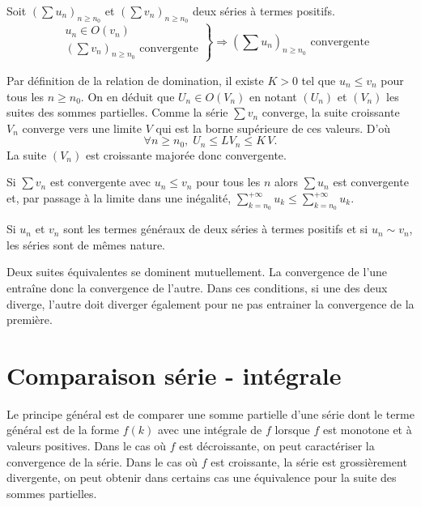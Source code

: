 \begin{prop}
  Soit $\left( \sum u_n\right)_{n\geq n_0}$ et $\left( \sum v_n\right)_{n\geq n_0}$ deux séries à termes positifs.
\begin{displaymath}
  \left. 
  \begin{aligned}
    &u_n \in O(v_n) \\ &\left( \sum v_n\right)_{n\geq n_0} \text{ convergente}
  \end{aligned}
  \right\rbrace 
\Rightarrow \left( \sum u_n\right)_{n\geq n_0} \text{ convergente}
\end{displaymath}
\end{prop}
\begin{demo}
Par définition de la relation de domination, il existe $K>0$ tel que $u_n \leq v_n$ pour tous les $n \geq n_0$. On en déduit que $U_n \in O(V_n)$ en notant $(U_n)$ et $(V_n)$ les suites des sommes partielles. Comme la série $\sum v_n$ converge, la suite croissante $V_n$ converge vers une limite $V$ qui est la borne supérieure de ces valeurs. D'où
\[
 \forall n \geq n_0, \; U_n \leq LV_n \leq K\, V.
\]
La suite $(V_n)$ est croissante majorée donc convergente.
\end{demo}
\begin{rem}
 Si $\sum v_n$ est convergente avec $u_n \leq v_n$ pour tous les $n$ alors $\sum u_n$ est convergente et, par passage à la limite dans une inégalité, $\sum_{k=n_0}^{+\infty} u_k \leq \sum_{k=n_0}^{+\infty} u_k$.
\end{rem}

\begin{prop}
  Si $u_n$ et $v_n$ sont les termes généraux de deux séries à termes positifs et si $u_n \sim v_n$, les séries sont de mêmes nature.
\end{prop}
\begin{demo}
  Deux suites équivalentes se dominent mutuellement. La convergence de l'une entraîne donc la convergence de l'autre. Dans ces conditions, si une des deux diverge, l'autre doit diverger également pour ne pas entrainer la convergence de la première.
\end{demo}


\section{Comparaison série - intégrale}
Le principe général est de comparer une somme partielle d'une série dont le terme général est de la forme $f(k)$ avec une intégrale de $f$ lorsque $f$ est monotone et à valeurs positives. Dans le cas où $f$ est décroissante, on peut caractériser la convergence de la série. Dans le cas où $f$ est croissante, la série est grossièrement divergente, on peut obtenir dans certains cas une équivalence pour la suite des sommes partielles.

